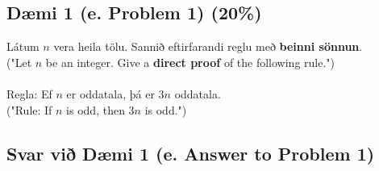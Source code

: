 \subsection*{Dæmi 1 (e. Problem 1) (20\%)\label{section:daemi1}}
Látum $n$ vera heila tölu. Sannið eftirfarandi reglu með \textbf{beinni sönnun}. \\
("Let $n$ be an integer. Give a \textbf{direct proof} of the following rule.") \\ \\
\indent Regla: Ef $n$ er oddatala, þá er $3n$ oddatala. \\
\indent ("Rule: If $n$ is odd, then $3n$ is odd.")

\subsection*{Svar við Dæmi 1 (e. Answer to Problem 1)}

\newcommand{\makeAnswerBoxProblemOne}{
  \noindent
  \begin{tcolorbox}[colframe=black, colback=white, boxrule=0.5pt, arc=0pt, outer arc=0pt, height=\dimexpr\textheight-\ht\strutbox-12\baselineskip\relax]

    
  \end{tcolorbox}
}

\makeAnswerBoxProblemOne

